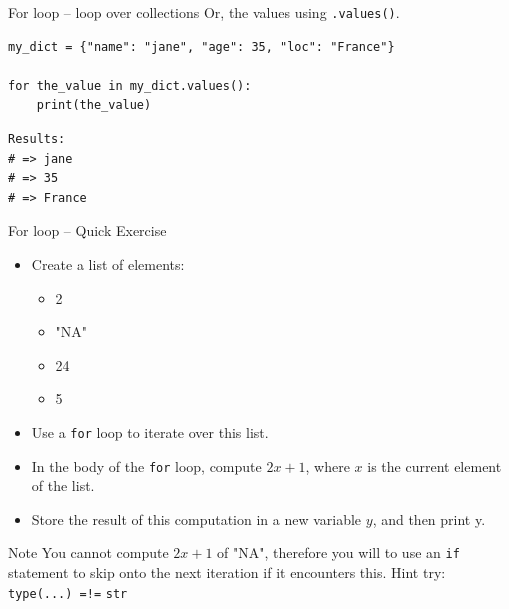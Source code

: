 \documentclass[10pt]{beamer}
\begin{document}
\begin{frame}[label={sec:org07622ad},fragile]{For loop -- loop over collections}
 Or, the values using \texttt{.values()}.

\begin{verbatim}
my_dict = {"name": "jane", "age": 35, "loc": "France"}

for the_value in my_dict.values():
    print(the_value)
\end{verbatim}

\begin{verbatim}
Results: 
# => jane
# => 35
# => France
\end{verbatim}
\end{frame}

\begin{frame}[label={sec:orgf5859e6},fragile]{For loop -- Quick Exercise}
 \begin{itemize}
\item Create a list of elements:

\begin{itemize}
\item 2
\item "NA"
\item 24
\item 5
\end{itemize}

\item Use a \texttt{for} loop to iterate over this list.
\item In the body of the \texttt{for} loop, compute \(2x + 1\), where \(x\) is the current element of
the list.
\item Store the result of this computation in a new variable \(y\), and then print y.
\end{itemize}

\alert{Note} You cannot compute \(2x + 1\) of "NA", therefore you will to use an \texttt{if} statement
to skip onto the next iteration if it encounters this. \alert{Hint} try: \texttt{type(...) =!=} \texttt{str}
\end{frame}
\end{document}
